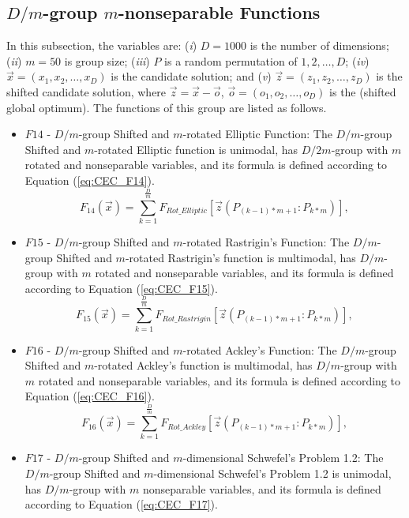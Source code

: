 \subsection{$D/m$-group $m$-nonseparable Functions}
In this subsection, the variables are: (\emph{i}) $D = 1000$ is the number of dimensions; (\emph{ii}) $m = 50$ is group size; (\emph{iii}) $P$ is a random permutation of ${1, 2, \ldots, D}$; (\emph{iv}) $\vec{x} = (x_1, x_2, \ldots, x_D)$ is the candidate solution; and (\emph{v}) $\vec{z} = (z_1, z_2, \ldots, z_D)$ is the shifted candidate solution, where $\vec{z} = \vec{x} - \vec{o}$, $\vec{o} = (o_1, o_2, \ldots, o_D)$ is the (shifted global optimum). The functions of this group are listed as follows.

\begin{itemize}
  \item $F14$ - $D/m$-group Shifted and $m$-rotated Elliptic Function: The $D/m$-group Shifted and $m$-rotated Elliptic function is unimodal, has $D/2m$-group with $m$ rotated and nonseparable variables, and its formula is defined according to Equation (\ref{eq:CEC_F14}).
      \begin{equation}\label{eq:CEC_F14}
            F_{14}(\vec{x}) = \sum_{k=1}^{\frac{D}{m}}F_{Rot\_{Elliptic}}[\vec{z}(P_{(k-1) \ast m+1}:P_{k \ast m})],
      \end{equation}
  \item $F15$ - $D/m$-group Shifted and $m$-rotated Rastrigin's Function: The $D/m$-group Shifted and $m$-rotated Rastrigin's function is multimodal, has $D/m$-group with $m$ rotated and nonseparable variables, and its formula is defined according to Equation (\ref{eq:CEC_F15}).
      \begin{equation}\label{eq:CEC_F15}
            F_{15}(\vec{x}) = \sum_{k=1}^{\frac{D}{m}}F_{Rot\_{Rastrigin}}[\vec{z}(P_{(k-1) \ast m+1}:P_{k \ast m})],
      \end{equation}
  \item $F16$ - $D/m$-group Shifted and $m$-rotated Ackley's Function: The $D/m$-group Shifted and $m$-rotated Ackley's function is multimodal, has $D/m$-group with $m$ rotated and nonseparable variables, and its formula is defined according to Equation (\ref{eq:CEC_F16}).
      \begin{equation}\label{eq:CEC_F16}
            F_{16}(\vec{x}) = \sum_{k=1}^{\frac{D}{m}}F_{Rot\_{Ackley}}[\vec{z}(P_{(k-1) \ast m+1}:P_{k \ast m})],
      \end{equation}
  \item $F17$ - $D/m$-group Shifted and $m$-dimensional Schwefel's Problem 1.2: The $D/m$-group Shifted and $m$-dimensional Schwefel's Problem 1.2 is unimodal, has $D/m$-group with $m$ nonseparable variables, and its formula is defined according to Equation (\ref{eq:CEC_F17}).

\end{itemize}
